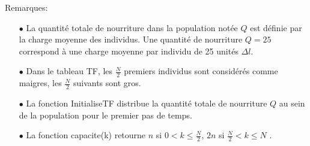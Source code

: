 Remarques:
\begin{itemize}
\item[$\bullet$]La quantité totale de nourriture dans la population notée $Q$ est définie par la charge moyenne des individus. Une quantité de nourriture $Q=25$ correspond à une charge moyenne par individu de 25 unités $\Delta l$.
\item[$\bullet$]Dans le tableau TF, les $\frac{N}{2}$ premiers individus sont considérés comme maigres, les $\frac{N}{2}$ suivants sont gros.
\item[$\bullet$]La fonction InitialiseTF distribue la quantité totale de nourriture $Q$ au sein de la population pour le premier pas de temps.
\item[$\bullet$]La fonction capacite(k) retourne $n$ si $0<k\leq\frac{N}{2}$, $2n$ si $\frac{N}{2}< k \leq N$ .
\end{itemize}



\pagebreak